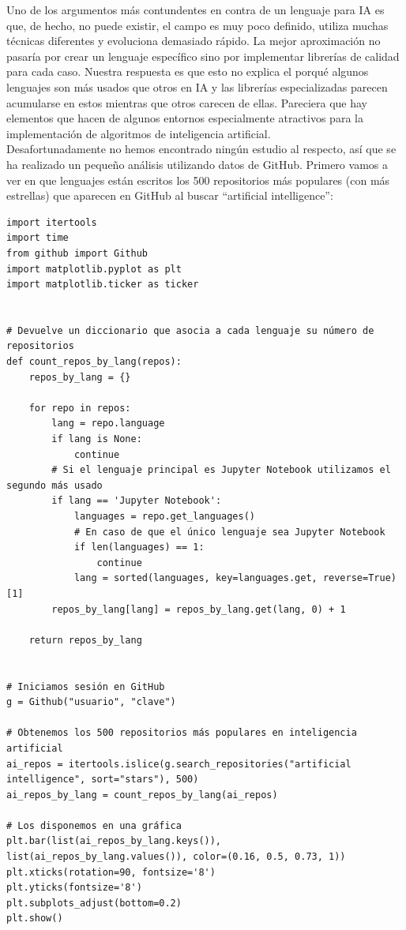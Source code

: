 Uno de los argumentos más contundentes en contra de un lenguaje para IA es que, de hecho, no puede existir, el campo es muy poco definido, utiliza muchas técnicas diferentes y evoluciona demasiado rápido. La mejor aproximación no pasaría por crear un lenguaje específico sino por implementar librerías de calidad para cada caso.
Nuestra respuesta es que esto no explica el porqué algunos lenguajes son más usados que otros en IA y las librerías especializadas parecen acumularse en estos mientras que otros carecen de ellas. Pareciera que hay elementos que hacen de algunos entornos especialmente atractivos para la implementación de algoritmos de inteligencia artificial. \\

Desafortunadamente no hemos encontrado ningún estudio al respecto, así que se ha realizado un pequeño análisis utilizando datos de GitHub. Primero vamos a ver en que lenguajes están escritos los 500 repositorios más populares (con más estrellas) que aparecen en GitHub al buscar ``artificial intelligence'':\\

\begin{lstlisting}[style=python, caption={Script para obtener el número de proyectos por lenguaje entre los 500 proyectos más importantes de Github}]
import itertools
import time
from github import Github
import matplotlib.pyplot as plt
import matplotlib.ticker as ticker


# Devuelve un diccionario que asocia a cada lenguaje su número de repositorios
def count_repos_by_lang(repos):
	repos_by_lang = {}

	for repo in repos:
		lang = repo.language
		if lang is None:
			continue
		# Si el lenguaje principal es Jupyter Notebook utilizamos el segundo más usado
		if lang == 'Jupyter Notebook':  
			languages = repo.get_languages()
			# En caso de que el único lenguaje sea Jupyter Notebook
			if len(languages) == 1:
				continue
			lang = sorted(languages, key=languages.get, reverse=True)[1]
		repos_by_lang[lang] = repos_by_lang.get(lang, 0) + 1

	return repos_by_lang


# Iniciamos sesión en GitHub
g = Github("usuario", "clave")

# Obtenemos los 500 repositorios más populares en inteligencia artificial
ai_repos = itertools.islice(g.search_repositories("artificial intelligence", sort="stars"), 500)
ai_repos_by_lang = count_repos_by_lang(ai_repos)

# Los disponemos en una gráfica
plt.bar(list(ai_repos_by_lang.keys()), list(ai_repos_by_lang.values()), color=(0.16, 0.5, 0.73, 1))
plt.xticks(rotation=90, fontsize='8')
plt.yticks(fontsize='8')
plt.subplots_adjust(bottom=0.2)
plt.show()
\end{lstlisting}

